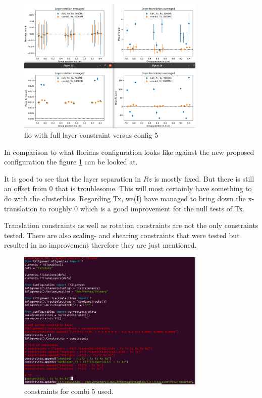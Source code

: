\begin{figure}
  \centering
  \includegraphics[width=0.8\textwidth]{plots/august_13/combi5_layers_averaged.png}
  \caption{flo with full layer constraint versus config 5}
  \label{fig:floFullL_c5}
\end{figure}

In comparison to what florians configuration looks like against the new proposed configuration the figure \ref{fig:floFullL_c5} can be looked at.

It is good to see that the layer separation in $Rz$ is mostly fixed. But there is still an offset from 0 that is troublesome. This will most certainly have something to do with the clusterbias. Regarding Tx, we(I) have managed to bring down the x-translation to roughly 0 which is a good improvement for the null tests of Tx.

Translation constraints as well as rotation constraints are not the only constraints tested. There are also scaling- and shearing constraints that were tested but
resulted in no improvement therefore they are just mentioned.

\begin{figure}
  \centering
  \includegraphics[width=0.8\textwidth]{plots/august_13/new_combi5_config.png}
  \caption{constraints for combi 5 used.}
  \label{fig:constraints_c5}
\end{figure}

